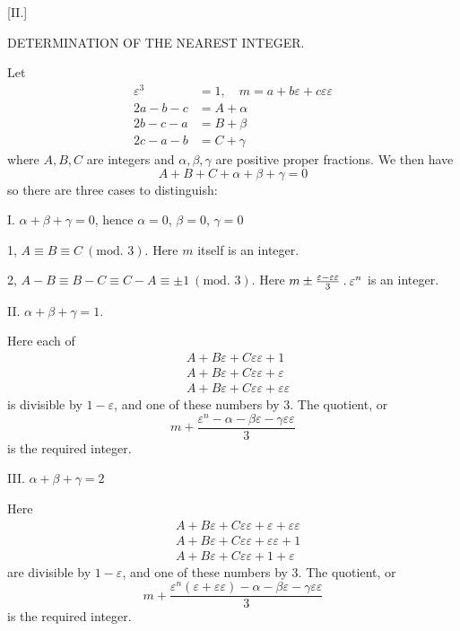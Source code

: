 \begin{center}[II.]\par\medskip
DETERMINATION OF THE NEAREST INTEGER.
\end{center}
Let
\[
\begin{aligned}
\varepsilon^3&=1,\quad m=a+b\varepsilon+c\varepsilon\varepsilon\\
2a-b-c&=A+\alpha\\
2b-c-a&=B+\beta\\
2c-a-b&=C+\gamma
\end{aligned}
\]
where $A,B,C$ are integers and $\alpha,\beta,\gamma$ are positive proper fractions. We then have
\[
A+B+C+\alpha+\beta+\gamma=0
\]
so there are three cases to distinguish:

I. $\alpha+\beta+\gamma=0$, hence $\alpha=0$, $\beta=0$, $\gamma=0$

1, $A\equiv B\equiv C\ (\text{mod. }3)$. Here $m$ itself is an integer.

2, $A-B\equiv B-C\equiv C-A\equiv\pm1\ (\text{mod. }3)$. Here $m\pm\frac{\varepsilon-\varepsilon\varepsilon}{3}\mathbin{.}\varepsilon^n$ is an integer.

II. $\alpha+\beta+\gamma=1$.

Here each of
\[
\begin{aligned}
&A+B\varepsilon+C\varepsilon\varepsilon+1\\
&A+B\varepsilon+C\varepsilon\varepsilon+\varepsilon\\
&A+B\varepsilon+C\varepsilon\varepsilon+\varepsilon\varepsilon
\end{aligned}
\]
%
is divisible by $1-\varepsilon$, and one of these numbers by $3$. The quotient, or
\[
m+\frac{\varepsilon^n-\alpha-\beta\varepsilon-\gamma\varepsilon\varepsilon}{3}
\]
is the required integer.

III. $\alpha+\beta+\gamma=2$

Here
\[
\begin{aligned}
&A+B\varepsilon+C\varepsilon\varepsilon+\varepsilon+\varepsilon\varepsilon\\
&A+B\varepsilon+C\varepsilon\varepsilon+\varepsilon\varepsilon+1\\
&A+B\varepsilon+C\varepsilon\varepsilon+1+\varepsilon
\end{aligned}
\]
are divisible by $1-\varepsilon$, and one of these numbers by $3$. The quotient, or
\[
m+\frac{\varepsilon^n(\varepsilon+\varepsilon\varepsilon)-\alpha-\beta\varepsilon-\gamma\varepsilon\varepsilon}{3}
\]
is the required integer.

